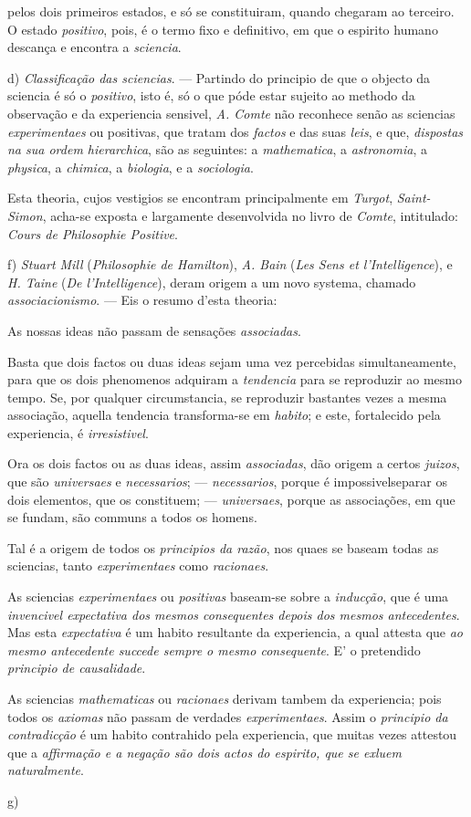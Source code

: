 pelos dois primeiros estados, e só se constituiram, quando chegaram ao terceiro. O estado \emph{positivo}, pois, é o termo fixo e definitivo, em que o espirito humano descança e encontra a \emph{sciencia}.\par d) \emph{Classificação das sciencias}. --- Partindo do principio de que o objecto da sciencia é só o \emph{positivo}, isto é, só o que póde estar sujeito ao methodo da observação e da experiencia sensivel, \emph{A. Comte} não reconhece senão as sciencias \emph{experimentaes} ou positivas, que tratam dos \emph{factos} e das suas \emph{leis}, e que, \emph{dispostas na sua ordem hierarchica}, são as seguintes: a \emph{mathematica}, a \emph{astronomia}, a \emph{physica}, a \emph{chimica}, a \emph{biologia}, e a \emph{sociologia}.\par Esta theoria, cujos vestigios se encontram principalmente em \emph{Turgot}, \emph{Saint-Simon}, acha-se exposta e largamente desenvolvida no livro de \emph{Comte}, intitulado: \emph{Cours de Philosophie Positive}.\par f) \emph{Stuart Mill} (\emph{Philosophie de Hamilton}), \emph{A. Bain} (\emph{Les Sens et l'Intelligence}), e \emph{H. Taine} (\emph{De l'Intelligence}), deram origem a um novo systema, chamado \emph{associacionismo}. --- Eis o resumo d'esta theoria:\par As nossas ideas não passam de sensações \emph{associadas}.\par Basta que dois factos ou duas ideas sejam uma vez percebidas simultaneamente, para que os dois phenomenos adquiram a \emph{tendencia} para se reproduzir ao mesmo tempo. Se, por qualquer circumstancia, se reproduzir bastantes vezes a mesma associação, aquella tendencia transforma-se em \emph{habito}; e este, fortalecido pela experiencia, é \emph{irresistivel}.\par Ora os dois factos ou as duas ideas, assim \emph{associadas}, dão origem a certos \emph{juizos}, que são \emph{universaes} e \emph{necessarios}; --- \emph{necessarios}, porque é impossivelseparar os dois elementos, que os constituem; --- \emph{universaes}, porque as associações, em que se fundam, são communs a todos os homens.\par Tal é a origem de todos os \emph{principios da razão}, nos quaes se baseam todas as sciencias, tanto \emph{experimentaes} como \emph{racionaes}.\par As sciencias \emph{experimentaes} ou \emph{positivas} baseam-se sobre a \emph{inducção}, que é uma \emph{invencivel expectativa dos mesmos consequentes depois dos mesmos antecedentes}. Mas esta \emph{expectativa} é um habito resultante da experiencia, a qual attesta que \emph{ao mesmo antecedente succede sempre o mesmo consequente}. E' o pretendido \emph{principio de causalidade}.\par As sciencias \emph{mathematicas} ou \emph{racionaes} derivam tambem da experiencia; pois todos os \emph{axiomas} não passam de verdades \emph{experimentaes}. Assim o \emph{principio da contradicção} é um habito contrahido pela experiencia, que muitas vezes attestou que a \emph{affirmação e a negação são dois actos do espirito, que se exluem naturalmente}.\par g) 